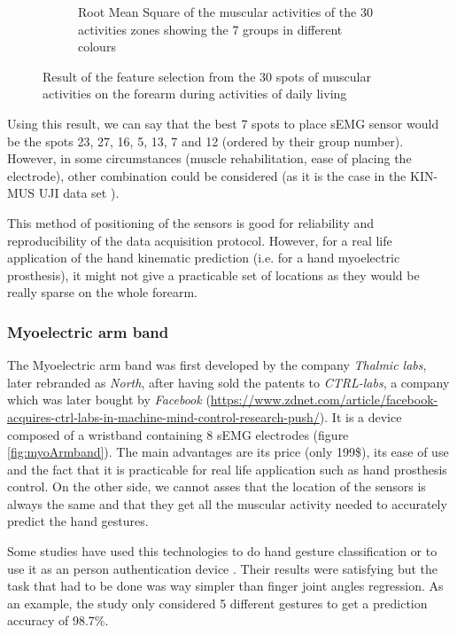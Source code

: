 \documentclass{article}
\begin{document}
\begin{figure}[H]
\begin{subfigure}{.45 \textwidth}
    \caption{Root Mean Square of the muscular activities of the 30 activities zones showing the 7 groups in different colours}
\label{fig:MRS}
\end{subfigure}
\caption{Result of the feature selection from the 30 spots of muscular activities on the forearm during activities of daily living \cite{ref:identifiedEMGlocation}}
\end{figure}

Using this result, we can say that the best 7 spots to place sEMG sensor would be the spots 23, 27, 16, 5, 13, 7 and 12 (ordered by their group number). However, in some circumstances (muscle rehabilitation, ease of placing the electrode), other combination could be considered (as it is the case in the KIN-MUS UJI data set \cite{ref:KinMusUji}).

This method of positioning of the sensors is good for reliability and reproducibility of the data acquisition protocol. However, for a real life application of the hand kinematic prediction (i.e. for a hand myoelectric prosthesis), it might not give a practicable set of locations as they would be really sparse on the whole forearm.


\subsubsection{Myoelectric arm band}

The Myoelectric \cite{ref:myoArmBand} arm band was first developed by the company \textit{Thalmic labs}, later rebranded as \textit{North}, after having sold the patents to \textit{CTRL-labs}, a company which was later bought by \textit{Facebook} (\url{https://www.zdnet.com/article/facebook-acquires-ctrl-labs-in-machine-mind-control-research-push/}). It is a device composed of a wristband containing 8 sEMG electrodes (figure \ref{fig:myoArmband}). The main advantages are its price (only 199\$), its ease of use and the fact that it is practicable for real life application such as hand prosthesis control. On the other side, we cannot asses that the location of the sensors is always the same and that they get all the muscular activity needed to accurately predict the hand gestures.

Some studies have used this technologies to do hand gesture classification \cite{ref:Zhang2019} or to use it as an person authentication device \cite{ref:electronics9122143}. Their results were satisfying but the task that had to be done was way simpler than finger joint angles regression. As an example, the study \cite{ref:Zhang2019} only considered 5 different gestures to get a prediction accuracy of 98.7\%.
\end{document}
